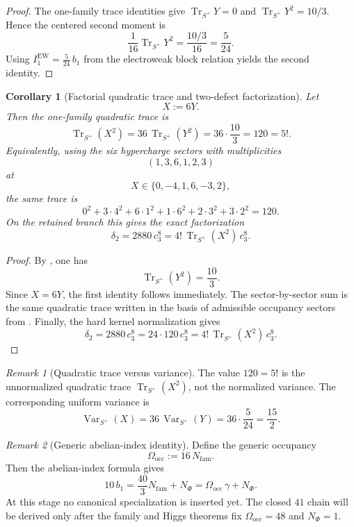 \documentclass[11pt,a4paper]{article}
\newtheorem{corollary}[theorem]{Corollary}
\theoremstyle{definition}
\theoremstyle{remark}
\newtheorem*{remark}{Remark}
\DeclareMathOperator{\tr}{Tr}
\newcommand{\cthree}{c_3}
\newcommand{\bone}{b_1}
\begin{document}
\begin{proof}
The one-family trace identities give $\tr_{S^+}Y=0$ and $\tr_{S^+}Y^2=10/3$. Hence the centered second moment is
\[
\frac{1}{16}\tr_{S^+}Y^2=\frac{10/3}{16}=\frac{5}{24}.
\]
Using $I_1^{\mathrm{EW}}=\frac{5}{24}\,\bone$ from the electroweak block relation yields the second identity.
\end{proof}

\begin{corollary}[Factorial quadratic trace and two-defect factorization]
\label{cor:factorial-trace-delta2}
Let
\[
X:=6Y.
\]
Then the one-family quadratic trace is
\[
\tr_{S^+}(X^2)
=
36\,\tr_{S^+}(Y^2)
=
36\cdot\frac{10}{3}
=
120
=
5!.
\]
Equivalently, using the six hypercharge sectors with multiplicities
\[
(1,3,6,1,2,3)
\]
at
\[
X\in\{0,-4,1,6,-3,2\},
\]
the same trace is
\[
0^2+3\cdot 4^2+6\cdot 1^2+1\cdot 6^2+2\cdot 3^2+3\cdot 2^2=120.
\]
On the retained branch this gives the exact factorization
\[
\delta_2
=
2880\,\cthree^8
=
4!\,\tr_{S^+}(X^2)\,\cthree^8.
\]
\end{corollary}

\begin{proof}
By , one has
\[
\tr_{S^+}(Y^2)=\frac{10}{3}.
\]
Since $X=6Y$, the first identity follows immediately. The sector-by-sector sum is the same quadratic trace written in the basis of admissible occupancy sectors from . Finally, the hard kernel normalization gives
\[
\delta_2=2880\,\cthree^8=24\cdot 120\,\cthree^8
=
4!\,\tr_{S^+}(X^2)\,\cthree^8.
\]
\end{proof}

\begin{remark}[Quadratic trace versus variance]
The value $120=5!$ is the unnormalized quadratic trace $\tr_{S^+}(X^2)$, not the normalized variance. The corresponding uniform variance is
\[
\operatorname{Var}_{S^+}(X)=36\,\operatorname{Var}_{S^+}(Y)=36\cdot\frac{5}{24}=\frac{15}{2}.
\]
\end{remark}

\begin{remark}[Generic abelian-index identity]
Define the generic occupancy
\[
\Omega_{\mathrm{occ}}:=16\,N_{\mathrm{fam}}.
\]
Then the abelian-index formula gives
\[
10\,\bone
=
\frac{40}{3}N_{\mathrm{fam}}+N_\Phi
=
\Omega_{\mathrm{occ}}\,\gamma+N_\Phi.
\]
At this stage no canonical specialization is inserted yet. The closed $41$ chain will be derived
only after the family and Higgs theorems fix $\Omega_{\mathrm{occ}}=48$ and $N_\Phi=1$.
\end{remark}
\end{document}
